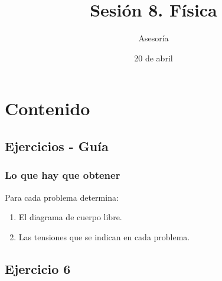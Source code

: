 \documentclass[12pt]{beamer}
\date{20 de abril}
\title{Sesión 8. Física}
\subtitle{Asesoría}
\begin{document}
\maketitle
\fontsize{14}{14}\selectfont
{}

\section*{Contenido}

\subsection{Ejercicios - Guía}

\begin{frame}
\frametitle{Lo que hay que obtener}
Para cada problema determina:
\pause
{}
\begin{enumerate}[<+->]
\item El diagrama de cuerpo libre.
\item Las tensiones que se indican en cada problema.
\end{enumerate}
\end{frame}

\subsection*{Ejercicio 6}
\end{document}

